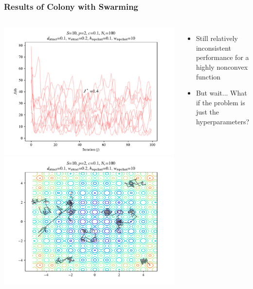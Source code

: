 \documentclass{beamer}
\begin{document}
\begin{frame}
\frametitle{Results of Colony with Swarming}
\begin{columns}[T]
    \begin{center}
      \includegraphics[scale=0.3]{assets/rastrigin_colony_J}
      \includegraphics[scale=0.3]{assets/rastrigin_colony_theta}
    \end{center}
    \begin{itemize}
      \item Still relatively inconsistent performance for a highly nonconvex function
      \item But wait... What if the problem is just the hyperparameters?
    \end{itemize}
\end{columns}
\end{frame}
\end{document}
